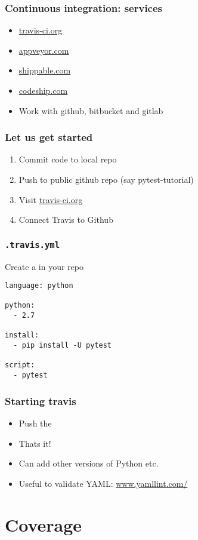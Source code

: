 \documentclass[14pt,compress]{beamer}
\begin{document}
\begin{frame}
  \frametitle{Continuous integration: services}
  \begin{itemize}
  \item \url{travis-ci.org}
  \item \url{appveyor.com}
  \item \url{shippable.com}
  \item \url{codeship.com}
  \item Work with github, bitbucket and gitlab
  \end{itemize}
\end{frame}

\begin{frame}
  \frametitle{Let us get started}
  \begin{enumerate}
  \item Commit code to local repo
  \item Push to public github repo (say pytest-tutorial)
  \item Visit \url{travis-ci.org}
  \item Connect Travis to Github
  \end{enumerate}
\end{frame}

\begin{frame}[fragile]
  \frametitle{\texttt{.travis.yml}}
  Create a  in your repo
  \begin{lstlisting}
language: python

python:
  - 2.7

install:
  - pip install -U pytest

script:
  - pytest
\end{lstlisting}
\end{frame}

\begin{frame}
  \frametitle{Starting travis}
  \begin{itemize}
  \item Push the 
  \item Thats it!
  \item Can add other versions of Python etc.
  \item Useful to validate YAML: \url{www.yamllint.com/}
  \end{itemize}
\end{frame}


\section{Coverage}
\end{document}
